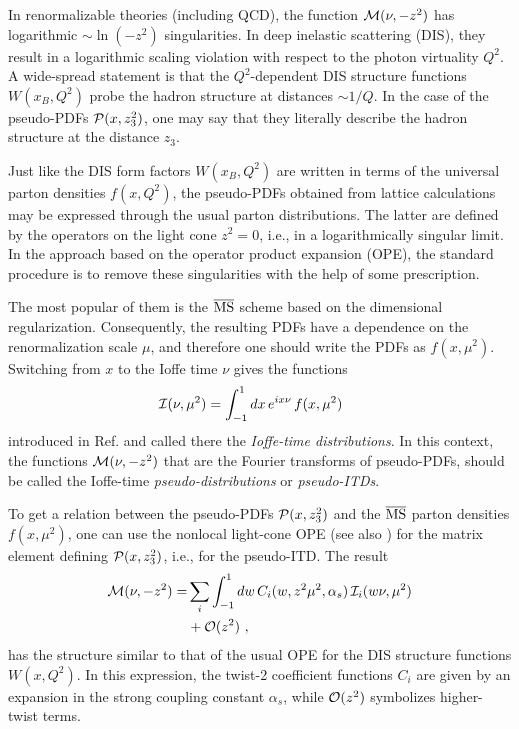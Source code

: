 \documentclass[aps,prd,twocolumn,showpacs,preprintnumbers,superscriptaddress]{revtex4-1}
\newcommand{\nn}{\nonumber \\ }
\begin{document}
 

  In renormalizable theories (including QCD),    
  the function  $ {\cal M} (\nu, -z^2)  $ 
 has  logarithmic $\sim \ln (-z^2)$  singularities.
 In deep inelastic scattering (DIS), they  result
 in a logarithmic  scaling violation with respect 
 to the photon virtuality  $Q^2$. 
 A wide-spread  statement is that the \mbox{$Q^2$-dependent}   DIS structure functions 
  $W(x_B,Q^2)$  probe the   hadron structure 
 at distances $\sim 1/Q$.  
 In the case  of the pseudo-PDFs ${\cal P} (x,z_3^2)$, 
 one may say that  they literally describe the hadron structure 
 at  the distance $z_3$.
 
 Just like the  DIS  form factors  $W(x_B,Q^2)$ are  
 written in terms of  the universal parton densities $f(x, Q^2)$,  
 the pseudo-PDFs   obtained   from 
 lattice calculations   may  be expressed through  the usual 
 parton distributions. The  latter are  defined by 
 the operators on the light cone $z^2=0$, i.e., in a 
 logarithmically  singular limit.
  In the approach based on  the operator product expansion
(OPE),  the standard procedure is to  remove  these singularities  with the help of some 
 prescription. 
 
 The most popular of them is the  $\overline{\rm MS}$  scheme based 
on the dimensional  regularization.  
Consequently,  the resulting PDFs  have a dependence on the renormalization scale 
$\mu$, and therefore one should write the PDFs as $   f(x, \mu^2)$.  
Switching from $x$  to the Ioffe time $\nu$ gives  the functions 
 \begin{align}
 {\cal I} (\nu, \mu^2) 
&   = 
 \int_{-1}^1 dx 
 \, e^{i x \nu  } \,  f (x, \mu^2)  \    
  \label{ITD}
\end{align}
introduced in Ref.  \cite{Braun:1994jq}  and  called there  the {\it Ioffe-time distributions}. 
In this context, the 
functions  ${\cal M}(\nu , -z^2) $   that are  the  Fourier transforms of
pseudo-PDFs,    should be called the  Ioffe-time {\it pseudo-distributions}
or {\it pseudo-ITDs}.  



To get  a relation between the pseudo-PDFs ${\cal P} (x,z_3^2)$  and the
$\overline{\rm MS}$     parton densities $ f(x, \mu^2)$, one can use 
 the  nonlocal  light-cone OPE \cite{Anikin:1978tj,Balitsky:1987bk}
 (see also \cite{Radyushkin:2017lvu}) 
for  the  matrix element defining 
${\cal P} (x,z_3^2)$, i.e., for  the pseudo-ITD. The result  
\begin{align} 
{\cal M } (\nu, -z^2 ) =&  \sum_i  \int_{-1}^1 dw \, C_i (w, z^2 \mu ^2, \alpha_s) \,  {\cal I}_i (w \nu,\mu^2) 
\nn & + {\cal O} (z^2) 
  \  ,
\label{OPE}
\end{align}
has the   structure  similar to that of the usual  OPE  for the DIS structure functions $W (x, Q^2)$.   
In this expression,   the twist-2 coefficient functions $C_i$ are   
given by an expansion in the strong coupling constant $\alpha_s$,
while  ${\cal O} (z^2) $ symbolizes  higher-twist terms.
\end{document}
